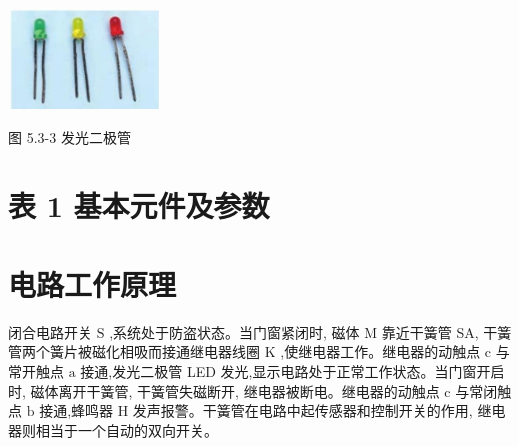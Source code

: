 \documentclass[10pt]{article}
\begin{document}
\begin{center}
\includegraphics[max width=0.3\textwidth]{images/01910e72-c5b7-7ed5-a6d4-fb3a5faefc32_108_798071.jpg}
\end{center}

图 5.3-3 发光二极管

\section*{表 1 基本元件及参数}

\begin{center}
\end{center}

\section*{电路工作原理}

闭合电路开关 \(\mathrm{S}\) ,系统处于防盗状态。当门窗紧闭时, 磁体 M 靠近干簧管 SA, 干簧管两个簧片被磁化相吸而接通继电器线圈 \(\mathrm{K}\) ,使继电器工作。继电器的动触点 \(\mathrm{c}\) 与常开触点 \(\mathrm{a}\) 接通,发光二极管 LED 发光,显示电路处于正常工作状态。当门窗开启时, 磁体离开干簧管, 干簧管失磁断开, 继电器被断电。继电器的动触点 \(\mathrm{c}\) 与常闭触点 \(\mathrm{b}\) 接通,蜂鸣器 \(\mathrm{H}\) 发声报警。干簧管在电路中起传感器和控制开关的作用, 继电器则相当于一个自动的双向开关。
\end{document}
